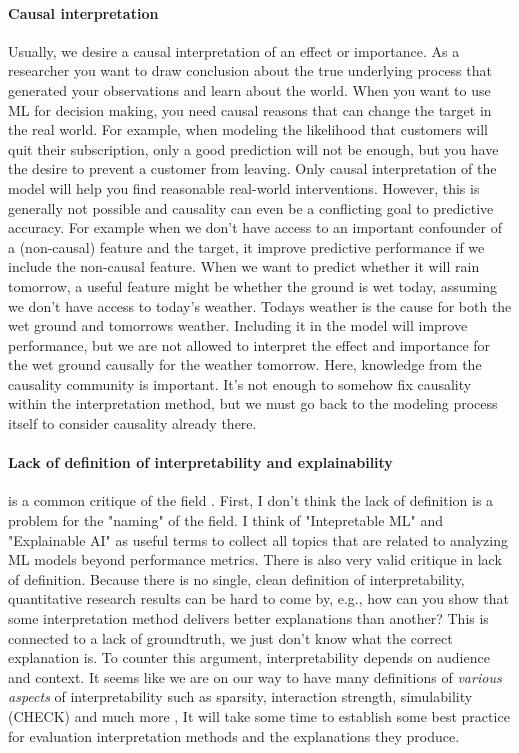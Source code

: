 \documentclass[runningheads]{llncs}
\begin{document}
\paragraph{Causal interpretation}
Usually, we desire a causal interpretation of an effect or importance.
As a researcher you want to draw conclusion about the true underlying process that generated your observations and learn about the world.
When you want to use ML for decision making, you need causal reasons that can change the target in the real world.
For example, when modeling the likelihood that customers will quit their subscription, only a good prediction will not be enough, but you have the desire to prevent a customer from leaving.
Only causal interpretation of the model will help you find reasonable real-world interventions.
However, this is generally not possible and causality can even be a conflicting goal to predictive accuracy.
For example when we don't have access to an important confounder of a (non-causal) feature and the target, it improve predictive performance if we include the non-causal feature.
When we want to predict whether it will rain tomorrow, a useful feature might be whether the ground is wet today, assuming we don't have access to today's weather.
Todays weather is the cause for both the wet ground and tomorrows weather.
Including it in the model will improve performance, but we are not allowed to interpret the effect and importance for the wet ground causally for the weather tomorrow.
Here, knowledge from the causality community is important.
It's not enough to somehow fix causality within the interpretation method, but we must go back to the modeling process itself to consider causality already there.

\paragraph{Lack of definition of interpretability and explainability} is a common critique of the field \cite{lipton2018mythos}.
First, I don't think the lack of definition is a problem for the "naming" of the field.
I think of "Intepretable ML" and "Explainable AI" as useful terms to collect all topics that are related to analyzing ML models beyond performance metrics.
There is also very valid critique in lack of definition.
Because there is no single, clean definition of interpretability, quantitative research results can be hard to come by, e.g., how can you show that some interpretation method delivers better explanations than another?
This is connected to a lack of groundtruth, we just don't know what the correct explanation is.
To counter this argument, interpretability depends on audience and context.
It seems like we are on our way to have many definitions of \textit{various aspects} of interpretability such as sparsity, interaction strength, simulability (CHECK) and much more \cite{poursabzi2018manipulating,philipp2018measuring,molnar2019quantifying,hauenstein2018computing,zhou2018measuring,akaike1998information,schwarz1978estimating,poursabzi2018manipulating,dhurandhar2017tip,friedler2019assessing},
It will take some time to establish some best practice for evaluation interpretation methods and the explanations they produce.
\end{document}
